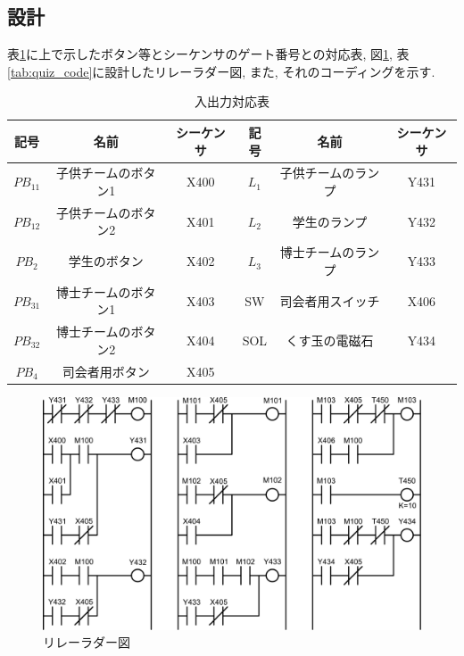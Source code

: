 \documentclass[titlepage]{jsarticle}
\begin{document}
  \subsection{設計}
    表\ref{tab:taiou}に上で示したボタン等とシーケンサのゲート番号との対応表,
    図\ref{fig:quiz_lad}, 表\ref{tab:quiz_code}に設計したリレーラダー図, また, それのコーディングを示す.
    \begin{table}[h]
      \caption{入出力対応表}
      \label{tab:taiou}
      \centering
      \begin{tabular}{c|c|c||c|c|c}
        \hline
        記号 &       名前 &             シーケンサ & 記号 &   名前 &            シーケンサ \\ \hline \hline
        $PB_{11}$ & 子供チームのボタン1 & X400 &     $L_1$ & 子供チームのランプ & Y431 \\
        $PB_{12}$ & 子供チームのボタン2 & X401 &     $L_2$ & 学生のランプ      & Y432 \\
        $PB_2$ &    学生のボタン &       X402 &     $L_3$ & 博士チームのランプ & Y433 \\
        $PB_{31}$ & 博士チームのボタン1 & X403 &     SW &    司会者用スイッチ   & X406 \\
        $PB_{32}$ & 博士チームのボタン2 & X404 &     SOL &   くす玉の電磁石    & Y434 \\
        $PB_4$ &    司会者用ボタン &     X405 & & & \\ \hline
      \end{tabular}
    \end{table}
    \begin{figure}[h]
      \centering
      \includegraphics[width=14cm]{images/quiz_lad.pdf}
      \caption{リレーラダー図}
      \label{fig:quiz_lad}
    \end{figure}
\end{document}
